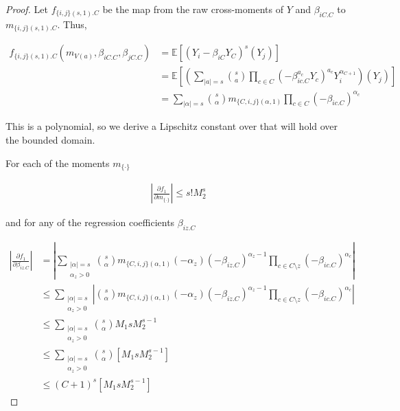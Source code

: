 \documentclass[]{article}
\newcommand{\E}{\mathbb{E}}
\begin{document}
\begin{proof} 

Let $f_{\{i,j\}(s,1).C} $ be the map from the raw cross-moments of $Y$ and $\beta_{iC.C}$ to $m_{\{i,j\}(s,1).C}$. Thus,

\begin{equation}
\begin{aligned}
f_{\{i,j\}(s,1).C}\left(m_{V(a)}, \beta_{iC.C}, \beta_{jC.C}\right) &= \E\left[(Y_i - \beta_{iC}Y_C)^s (Y_j)\right]
\\
 &= \E\left[\left(\sum_{|a| = s} {s \choose a} \prod_{c \in C}(-\beta_{ic.C}^{a_c}Y_c)^{a_c} Y_i^{\alpha_{C+1}}\right)(Y_j )\right]
\\
& = \sum_{|\alpha| = s} {s \choose \alpha} m_{\{C,i,j\}(\alpha, 1)} \prod_{c \in C}(-\beta_{ic.C})^{\alpha_c}
\end{aligned}
\end{equation}

This is a polynomial, so we derive a Lipschitz constant over that will hold over the bounded domain. 

For each of the moments $m_{\{\cdot \}}$

\begin{equation}
\begin{aligned}
\left|\frac{\partial f_1}{\partial m_{\{\cdot\}} } \right| \leq s! M_2^{s}
\end{aligned}
\end{equation}

and for any of the regression coefficients $\beta_{iz.C}$

\begin{equation}
\begin{aligned}
\left|\frac{\partial f_1}{\partial \beta_{iz.C}} \right|  &= \left| \sum_{\substack{|\alpha| = s \\\alpha_z > 0}} {s \choose \alpha} m_{\{C,i,j\}(\alpha, 1)} (-\alpha_z)(-\beta_{iz.C})^{\alpha_z - 1} \prod_{c \in C\setminus z}(-\beta_{ic.C})^{\alpha_c} \right|
\\
& \leq \sum_{\substack{|\alpha| = s \\\alpha_z > 0}} \left| {s \choose \alpha} m_{\{C,i,j\}(\alpha, 1)} (-\alpha_z)(-\beta_{iz.C})^{\alpha_z - 1} \prod_{c \in C\setminus z}(-\beta_{ic.C})^{\alpha_c} \right|
\\
& \leq \sum_{\substack{|\alpha| = s \\\alpha_z > 0}} {s \choose \alpha} M_1 s M_2^{s - 1}
\\
& \leq \sum_{\substack{|\alpha| = s \\ \alpha_z > 0}} {s \choose \alpha} \left[M_1 s M_2^{s - 1}\right] 
\\
& \leq (C+1)^s \left[M_1 s M_2^{s - 1} \right]
\end{aligned}
\end{equation}


\end{proof}
\end{document}
